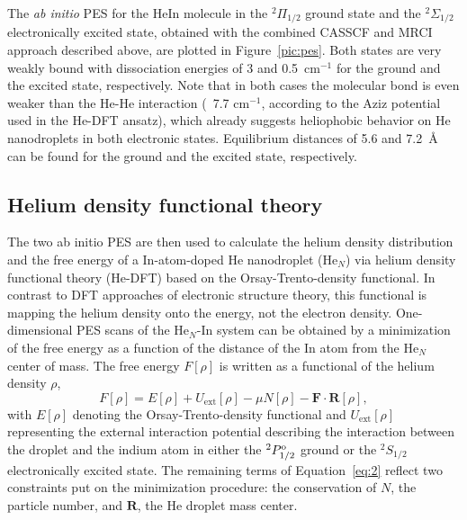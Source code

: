 \documentclass[twoside,twocolumn,9pt]{article}
\begin{document}
The \emph{ab initio} PES for the HeIn molecule in the $^2\Pi{}_{1/2}$ ground state and the $^2\Sigma{}_{1/2}$ electronically excited state, obtained with the combined CASSCF and MRCI approach described above, are plotted in Figure~\ref{pic:pes}. Both states are very weakly bound with dissociation energies of 3 and 0.5~cm$^{-1}$ for the ground and the excited state, respectively. Note that in both cases the molecular bond is even weaker than the He-He interaction (~7.7 cm$^{-1}$, according to the Aziz potential\cite{Janzen:1997hv} used in the He-DFT ansatz), which already suggests heliophobic behavior on He nanodroplets in both electronic states.  Equilibrium distances of 5.6 and 7.2~\AA{} can be found for the ground and the excited state, respectively. 

\subsection{Helium density functional theory}
The two ab initio PES are then used to calculate the helium density distribution and the free energy of a In-atom-doped He nanodroplet (He$_N$) via helium density functional theory (He-DFT) based on the Orsay-Trento-density functional.\cite{Dalfovo:1995gf} In contrast to DFT approaches of electronic structure theory, this functional is mapping the helium density onto the energy, not the electron density. One-dimensional PES scans of the He$_{N}$-In system can be obtained by a minimization of the free energy as a function of the distance of the In atom from the He$_{N}$ center of mass. The free energy $F[\rho]$ is written as a functional of the helium density $\rho$,
\begin{equation}
  \label{eq:he}
  F[\rho{}] = E[\rho] + U_{\mathrm{ext}}[\rho] - \mu{}N[\rho] - \mathbf{F}\cdot{}\mathbf{R}
[\rho], 
\end{equation}
with $E[\rho]$ denoting the Orsay-Trento-density functional and $U_{\mathrm{ext}}[\rho]$  representing the external interaction potential describing the interaction between the droplet and the indium atom in either the $^2P^{\rm o}_{1/2}$ ground or the $^2S_{1/2}$ electronically excited state. The remaining terms of Equation~\ref{eq:2} reflect two constraints put on the minimization procedure: the conservation of $N$, the particle number, and $\mathbf{R}$, the He droplet mass center.
\end{document}
